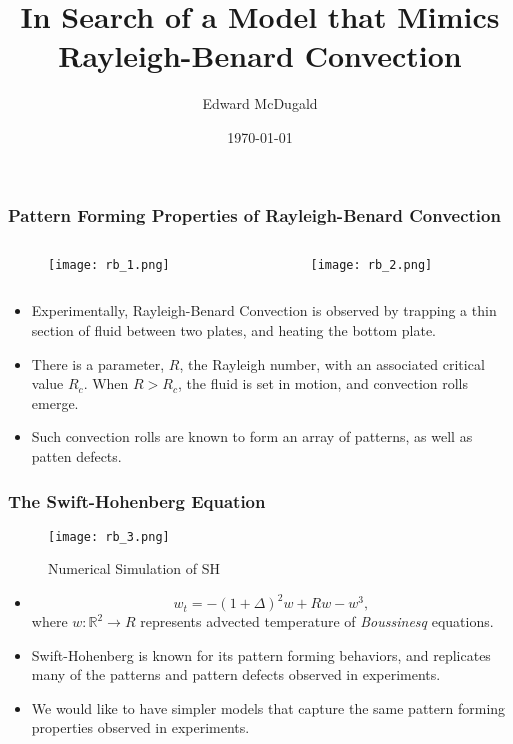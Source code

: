 \documentclass[]{beamer}
\title{In Search of a Model that Mimics Rayleigh-Benard Convection}
\author{Edward McDugald}
\institute{University of Arizona}
\date{\today}
\begin{document}
\begin{frame}
  \titlepage
\end{frame}

\begin{frame}
    \frametitle{Pattern Forming Properties of Rayleigh-Benard Convection}

    \begin{columns}[c]
    \begin{column}{.5\textwidth}
        \begin{figure}
        \centering
        \texttt{[image: rb\_1.png]}
        \end{figure}
    \end{column}
    \begin{column}{.5\textwidth}
        \begin{figure}
        \centering
        \texttt{[image: rb\_2.png]}
        \end{figure}
    \end{column}
    \end{columns}
\begin{itemize}
      \item Experimentally, Rayleigh-Benard Convection is observed by trapping a thin section of fluid between two plates, and heating the bottom plate.
    \item There is a parameter, $R$, the Rayleigh number, with an associated critical value $R_c$. When $R>R_c$, the fluid is set in motion, and convection rolls emerge.
    \item Such convection rolls are known to form an array of patterns, as well as patten defects.
\end{itemize}
\end{frame}

\begin{frame}
    \frametitle{The Swift-Hohenberg Equation}
        \begin{figure}
        \centering
        \texttt{[image: rb\_3.png]}
        \caption{Numerical Simulation of SH}
        \end{figure}
\begin{itemize}
      \item \[
              w_t = -(1+\Delta)^2w + Rw - w^3,
      \] 
      where $w:\mathbb{R}^2 \rightarrow R$ represents advected temperature of \emph{Boussinesq} equations.
  \item Swift-Hohenberg is known for its pattern forming behaviors, and replicates many of the patterns and pattern defects observed in experiments.
  \item We would like to have simpler models that capture the same pattern forming properties observed in experiments. 
\end{itemize}
\end{frame}
\end{document}
